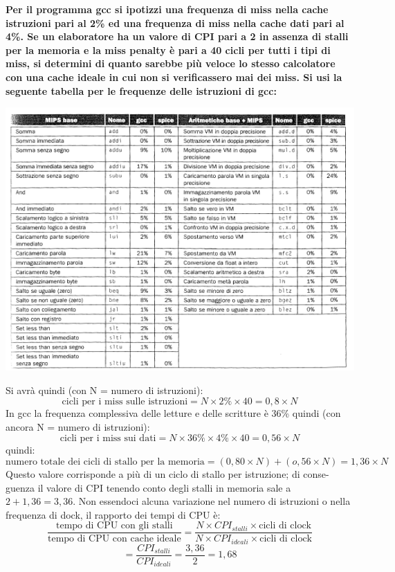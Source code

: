 \documentclass[a4paper,12pt, oneside]{book}
\begin{document}
\begin{esercizio}
\textbf{Per il programma gcc si ipotizzi una frequenza di miss nella
  cache istruzioni pari al 2\% ed una frequenza di miss nella cache
  dati pari al 4\%. Se un elaboratore ha un valore di CPI pari a 2 in
  assenza di stalli per la memoria e la miss penalty è pari a 40
  cicli per tutti i tipi di miss, si determini di quanto sarebbe più
  veloce lo stesso calcolatore con una cache ideale in cui non si
  verificassero mai dei miss. Si usi la seguente tabella per le
  frequenze delle istruzioni di gcc:}
\begin{center}
  \includegraphics[scale = 0.7]{img/gcc.png}
\end{center}
Si avrà quindi (con N = numero di istruzioni):
\[\mbox{cicli per i miss sulle istruzioni} = N\times 2\% \times 40 =
  0,8 \times N\]
In gcc la frequenza complessiva delle letture e delle scritture è 36\%
quindi (con ancora N = numero di istruzioni):
\[\mbox{cicli per i miss sui dati} = N \times 36\% \times 4\% \times
  40 = 0,56\times N\]
quindi:
\[\mbox{numero totale dei cicli di stallo per la memoria} =
  (0,80\times N)+(o,56\times N) = 1,36\times N\]
Questo valore corrisponde a più di un ciclo di stallo per istruzione; di conse-
guenza il valore di CPI tenendo conto degli stalli in memoria sale a $2 + 1,36 =
3,36$. Non essendoci alcuna variazione nel numero di istruzioni
o nella frequenza di dock, il rapporto dei tempi di CPU è:
\[\frac{\mbox{tempo di CPU con gli stalli}}{\mbox{tempo di CPU con
      cache ideale}}=\frac{N\times CPI_{stalli}\times \mbox{cicli di
      clock}}{N\times CPI_{ideali}\times \mbox{cicli di clock}}\]
  \[= \frac{CPI_{stalli}}{CPI_{ideali}}=\frac{3,36}{2} = 1,68\]

\end{esercizio}
\end{document}
